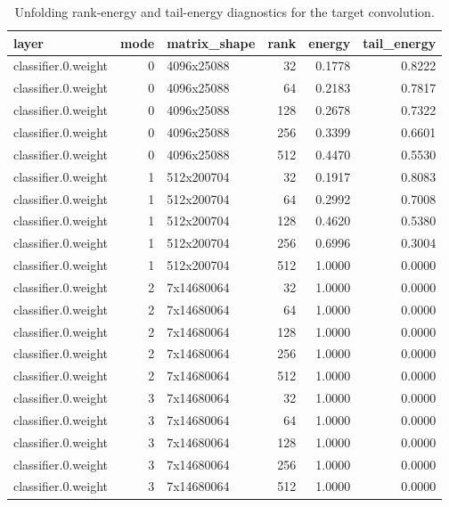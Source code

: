 \begin{table}
\caption{Unfolding rank-energy and tail-energy diagnostics for the target convolution.}
\label{tab:rank-energy}
\begin{tabular}{lrlrrr}
\toprule
layer & mode & matrix\_shape & rank & energy & tail\_energy \\
\midrule
classifier.0.weight & 0 & 4096x25088 & 32 & 0.1778 & 0.8222 \\
classifier.0.weight & 0 & 4096x25088 & 64 & 0.2183 & 0.7817 \\
classifier.0.weight & 0 & 4096x25088 & 128 & 0.2678 & 0.7322 \\
classifier.0.weight & 0 & 4096x25088 & 256 & 0.3399 & 0.6601 \\
classifier.0.weight & 0 & 4096x25088 & 512 & 0.4470 & 0.5530 \\
classifier.0.weight & 1 & 512x200704 & 32 & 0.1917 & 0.8083 \\
classifier.0.weight & 1 & 512x200704 & 64 & 0.2992 & 0.7008 \\
classifier.0.weight & 1 & 512x200704 & 128 & 0.4620 & 0.5380 \\
classifier.0.weight & 1 & 512x200704 & 256 & 0.6996 & 0.3004 \\
classifier.0.weight & 1 & 512x200704 & 512 & 1.0000 & 0.0000 \\
classifier.0.weight & 2 & 7x14680064 & 32 & 1.0000 & 0.0000 \\
classifier.0.weight & 2 & 7x14680064 & 64 & 1.0000 & 0.0000 \\
classifier.0.weight & 2 & 7x14680064 & 128 & 1.0000 & 0.0000 \\
classifier.0.weight & 2 & 7x14680064 & 256 & 1.0000 & 0.0000 \\
classifier.0.weight & 2 & 7x14680064 & 512 & 1.0000 & 0.0000 \\
classifier.0.weight & 3 & 7x14680064 & 32 & 1.0000 & 0.0000 \\
classifier.0.weight & 3 & 7x14680064 & 64 & 1.0000 & 0.0000 \\
classifier.0.weight & 3 & 7x14680064 & 128 & 1.0000 & 0.0000 \\
classifier.0.weight & 3 & 7x14680064 & 256 & 1.0000 & 0.0000 \\
classifier.0.weight & 3 & 7x14680064 & 512 & 1.0000 & 0.0000 \\
\bottomrule
\end{tabular}
\end{table}
